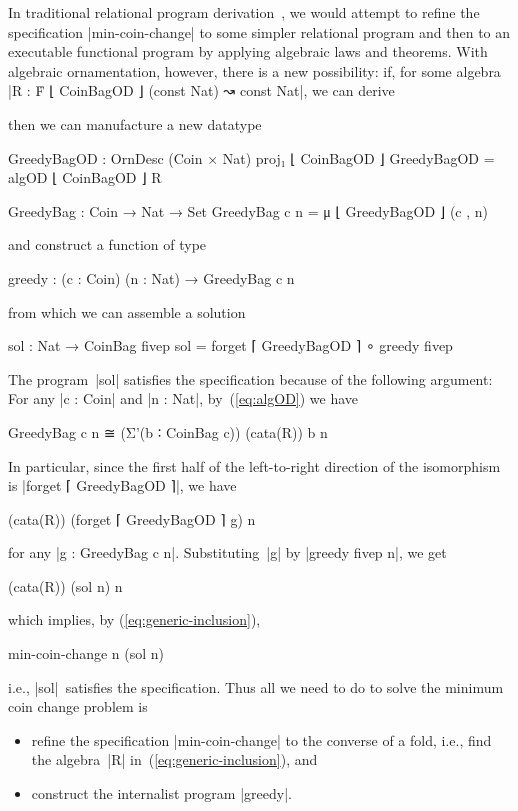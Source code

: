 In traditional relational program derivation~\citep{Bird-AoP}, we would attempt to refine the specification |min-coin-change| to some simpler relational program and then to an executable functional program by applying algebraic laws and theorems.
With algebraic ornamentation, however, there is a new possibility: if, for some algebra |R : Ḟ ⌊ CoinBagOD ⌋ (const Nat) ↝ const Nat|, we can derive
then we can manufacture a new datatype
\begin{code}
GreedyBagOD : OrnDesc (Coin × Nat) proj₁ ⌊ CoinBagOD ⌋
GreedyBagOD = algOD ⌊ CoinBagOD ⌋ R

GreedyBag : Coin → Nat → Set
GreedyBag c n = μ ⌊ GreedyBagOD ⌋ (c , n)
\end{code}
and construct a function of type
\begin{code}
greedy : (c : Coin) (n : Nat) → GreedyBag c n
\end{code}
from which we can assemble a solution
\begin{code}
sol : Nat → CoinBag fivep
sol = forget ⌈ GreedyBagOD ⌉ ∘ greedy fivep
\end{code}
The program~|sol| satisfies the specification because of the following argument:
For any |c : Coin| and |n : Nat|, by~(\ref{eq:algOD}) we have
\begin{code}
GreedyBag c n ≅ (Σ'(b ∶ CoinBag c)) (cata(R)) b n
\end{code}
In particular, since the first half of the left-to-right direction of the isomorphism is |forget ⌈ GreedyBagOD ⌉|, we have
\begin{code}
(cata(R)) (forget ⌈ GreedyBagOD ⌉ g) n
\end{code}
for any |g : GreedyBag c n|.
Substituting~|g| by |greedy fivep n|, we get
\begin{code}
(cata(R)) (sol n) n
\end{code}
which implies, by (\ref{eq:generic-inclusion}),
\begin{code}
min-coin-change n (sol n)
\end{code}
i.e., |sol|~satisfies the specification.
Thus all we need to do to solve the minimum coin change problem is
\begin{itemize}
\item refine the specification |min-coin-change| to the converse of a fold, i.e., find the algebra~|R| in~(\ref{eq:generic-inclusion}), and
\item construct the internalist program |greedy|.
\end{itemize}

